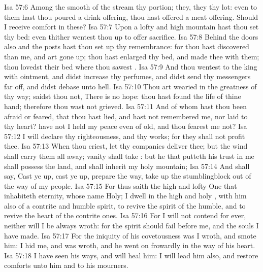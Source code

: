 \vs Isa 57:6 Among the smooth  of the stream  thy portion; they, they  thy lot: even to them hast thou poured a drink offering, thou hast offered a meat offering. Should I receive comfort in these?
\vs Isa 57:7 Upon a lofty and high mountain hast thou set thy bed: even thither wentest thou up to offer sacrifice.
\vs Isa 57:8 Behind the doors also and the posts hast thou set up thy remembrance: for thou hast discovered  than me, and art gone up; thou hast enlarged thy bed, and made thee  with them; thou lovedst their bed where thou sawest .
\vs Isa 57:9 And thou wentest to the king with ointment, and didst increase thy perfumes, and didst send thy messengers far off, and didst debase  unto hell.
\vs Isa 57:10 Thou art wearied in the greatness of thy way;  saidst thou not, There is no hope: thou hast found the life of thine hand; therefore thou wast not grieved.
\vs Isa 57:11 And of whom hast thou been afraid or feared, that thou hast lied, and hast not remembered me, nor laid  to thy heart? have not I held my peace even of old, and thou fearest me not?
\vs Isa 57:12 I will declare thy righteousness, and thy works; for they shall not profit thee.
\vs Isa 57:13 When thou criest, let thy companies deliver thee; but the wind shall carry them all away; vanity shall take : but he that putteth his trust in me shall possess the land, and shall inherit my holy mountain;
\vs Isa 57:14 And shall say, Cast ye up, cast ye up, prepare the way, take up the stumblingblock out of the way of my people.
\vs Isa 57:15 For thus saith the high and lofty One that inhabiteth eternity, whose name  Holy; I dwell in the high and holy , with him also  of a contrite and humble spirit, to revive the spirit of the humble, and to revive the heart of the contrite ones.
\vs Isa 57:16 For I will not contend for ever, neither will I be always wroth: for the spirit should fail before me, and the souls  I have made.
\vs Isa 57:17 For the iniquity of his covetousness was I wroth, and smote him: I hid me, and was wroth, and he went on frowardly in the way of his heart.
\vs Isa 57:18 I have seen his ways, and will heal him: I will lead him also, and restore comforts unto him and to his mourners.

